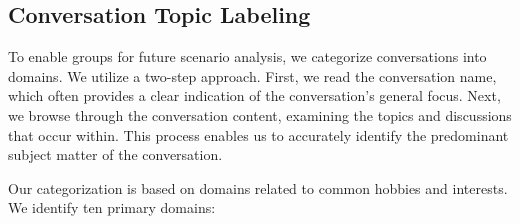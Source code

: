 



\subsection{Conversation Topic Labeling}
To enable groups for future scenario analysis, we categorize conversations into domains. We utilize a two-step approach. First, we read the conversation name, which often provides a clear indication of the conversation's general focus. Next, we browse through the conversation content, examining the topics and discussions that occur within. This process enables us to accurately identify the predominant subject matter of the conversation.

Our categorization is based on domains related to common hobbies and interests. We identify ten primary domains: 

